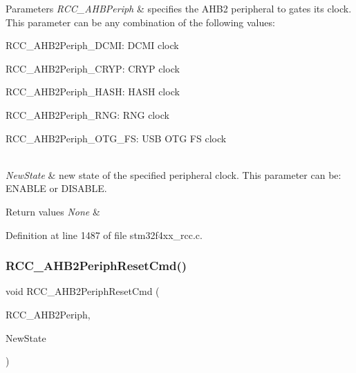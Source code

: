 \begin{DoxyParams}{Parameters}
{\em R\+C\+C\+\_\+\+A\+H\+B\+Periph} & specifies the A\+H\+B2 peripheral to gates its clock. This parameter can be any combination of the following values\+: \begin{DoxyItemize}
\item R\+C\+C\+\_\+\+A\+H\+B2\+Periph\+\_\+\+D\+C\+MI\+: D\+C\+MI clock \item R\+C\+C\+\_\+\+A\+H\+B2\+Periph\+\_\+\+C\+R\+YP\+: C\+R\+YP clock \item R\+C\+C\+\_\+\+A\+H\+B2\+Periph\+\_\+\+H\+A\+SH\+: H\+A\+SH clock \item R\+C\+C\+\_\+\+A\+H\+B2\+Periph\+\_\+\+R\+NG\+: R\+NG clock \item R\+C\+C\+\_\+\+A\+H\+B2\+Periph\+\_\+\+O\+T\+G\+\_\+\+FS\+: U\+SB O\+TG FS clock \end{DoxyItemize}
\\
\hline
{\em New\+State} & new state of the specified peripheral clock. This parameter can be\+: E\+N\+A\+B\+LE or D\+I\+S\+A\+B\+LE. \\
\hline
\end{DoxyParams}

\begin{DoxyRetVals}{Return values}
{\em None} & \\
\hline
\end{DoxyRetVals}


Definition at line 1487 of file stm32f4xx\+\_\+rcc.\+c.

\mbox{\label{group___r_c_c___group3_gafb119d6d1955d1b8c361e8140845ac5a}} 
\subsubsection{\texorpdfstring{R\+C\+C\+\_\+\+A\+H\+B2\+Periph\+Reset\+Cmd()}{RCC\_AHB2PeriphResetCmd()}}
{\footnotesize\ttfamily void R\+C\+C\+\_\+\+A\+H\+B2\+Periph\+Reset\+Cmd (\begin{DoxyParamCaption}\item[{uint32\+\_\+t}]{R\+C\+C\+\_\+\+A\+H\+B2\+Periph,  }\item[{Functional\+State}]{New\+State }\end{DoxyParamCaption})}



